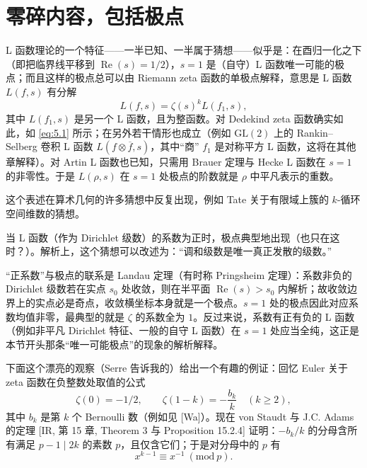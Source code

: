 \section{零碎内容，包括极点}\label{c2:sec:5}

L 函数理论的一个特征——一半已知、一半属于猜想——似乎是：在酉归一化之下（即把临界线平移到 $\operatorname{Re}(s)=1/2$），$s=1$ 是（自守）L 函数唯一可能的极点；而且这样的极点总可以由 Riemann zeta 函数的单极点解释，意思是 L 函数 $L(f,s)$ 有分解
\[
L(f,s)=\zeta(s)^kL(f_1,s),
\]
其中 $L(f_1,s)$ 是另一个 L 函数，且为整函数。对 Dedekind zeta 函数确实如此，如 \eqref{eq:5.1} 所示；在另外若干情形也成立（例如 $\mathrm{GL}(2)$ 上的 Rankin--Selberg 卷积 L 函数 $L(f\otimes\overline{f},s)$，其中“商” $f_1$ 是对称平方 L 函数，这将在其他章解释）。对 Artin L 函数也已知，只需用 Brauer 定理与 Hecke L 函数在 $s=1$ 的非零性。于是 $L(\rho,s)$ 在 $s=1$ 处极点的阶数就是 $\rho$ 中平凡表示的重数。

这个表述在算术几何的许多猜想中反复出现，例如 Tate 关于有限域上簇的 $k$-循环空间维数的猜想。

当 L 函数（作为 Dirichlet 级数）的系数为正时，极点典型地出现（也只在这时？）。解析上，这个猜想可以改述为：“调和级数是唯一真正发散的级数。”

\begin{annote}
“正系数”与极点的联系是 Landau 定理（有时称 Pringsheim 定理）：系数非负的 Dirichlet 级数若在实点 $s_0$ 处收敛，则在半平面 $\operatorname{Re}(s)>s_0$ 内解析；故收敛边界上的实点必是奇点，收敛横坐标本身就是一个极点。$s=1$ 处的极点因此对应系数均值非零，最典型的就是 $\zeta$ 的系数全为 $1$。反过来说，系数有正有负的 L 函数（例如非平凡 Dirichlet 特征、一般的自守 L 函数）在 $s=1$ 处应当全纯，这正是本节开头那条“唯一可能极点”的现象的解析解释。
\par\vspace{0.15em}{\raggedleft 【来源：Titchmarsh 前引书 Dirichlet 级数一章（A）；Davenport 前引书（A）】\par}
\end{annote}

下面这个漂亮的观察（Serre 告诉我的）给出一个有趣的例证：回忆 Euler 关于 zeta 函数在负整数处取值的公式
\begin{equation}\tag{5.1}\label{c2:eq:5.1}
\zeta(0)=-1/2,\qquad \zeta(1-k)=-\frac{b_k}{k}\quad(k\ge2),
\end{equation}
其中 $b_k$ 是第 $k$ 个 Bernoulli 数（例如见 [Wa]）。现在 von Staudt 与 J.C. Adams 的定理 [IR, 第 15 章, Theorem 3 与 Proposition 15.2.4] 证明：$-b_k/k$ 的分母含所有满足 $p-1\mid2k$ 的素数 $p$，且仅含它们；于是对分母中的 $p$ 有
\[
x^{k-1}\equiv x^{-1}\ (\mathrm{mod}\ p).
\]

